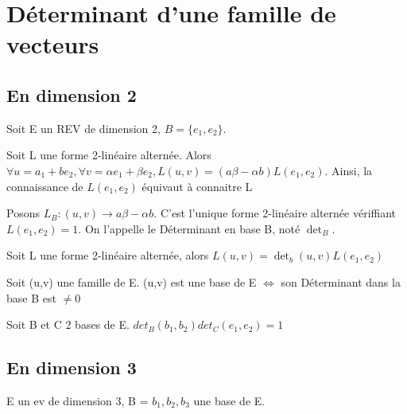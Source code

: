\documentclass[french]{yLectureNote}
\begin{document}
\section{Déterminant d'une famille de vecteurs}
\subsection{En dimension 2}
Soit E un REV de dimension 2, \(B = \{e_1,e_2\}\).
\begin{proposition}
Soit L une forme 2-linéaire alternée. Alors \(\forall u = a_1+be_2,\forall v = \alpha e_1+\beta e_2, L(u,v) = (a\beta-\alpha b)L(e_1,e_2)\). Ainsi, la connaissance de \(L(e_1,e_2)\) équivaut à connaitre L
\end{proposition}

\begin{definition}

Posons \(L_B : (u,v) \to a\beta -\alpha b\). C'est l'unique forme 2-linéaire alternée vériffiant \(L(e_1,e_2) = 1\). On l'appelle le Déterminant en base B, noté \(\det_B\).
\end{definition}
\begin{proposition}
Soit L une forme 2-linéaire alternée, alors \(L(u,v) = \det_b(u,v)L(e_1,e_2)\)
\end{proposition}
\begin{proposition}
Soit (u,v) une famille de E. (u,v) est une base de E \(\iff\) son Déterminant dans la base B est \(\neq 0\)
\end{proposition}
\begin{proposition}
Soit B et C 2 bases de E. \(det_B(b_1,b_2)det_C(e_1,e_2) = 1\)
\end{proposition}
\subsection{En dimension 3}
E un ev de dimension 3, B = \(b_1,b_2,b_3\) une base de E.
\end{document}
